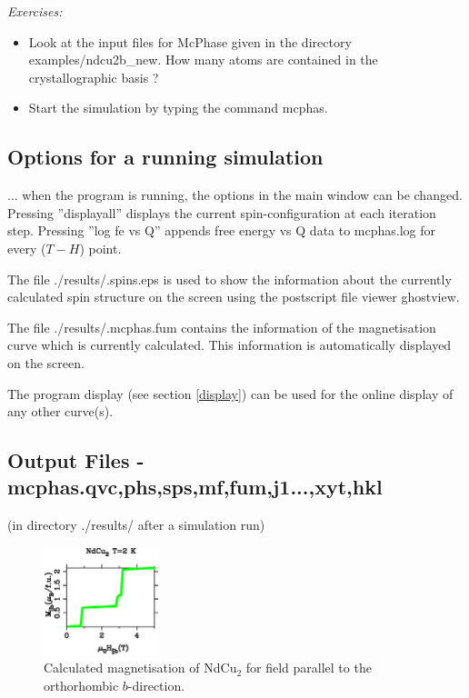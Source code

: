 \vspace{1cm}
{\em Exercises:}
\begin{itemize}
\item Look at the input files for {\prg McPhase} given in the directory
{\prg examples/ndcu2b\_new}.  How many atoms are contained in the crystallographic basis ?
\item
Start the simulation by typing the command {\prg mcphas}.
\end{itemize}



\subsection{Options for a running simulation}
... when the program is running, the options in the main window
can be changed. Pressing ''displayall'' displays the current spin-configuration
at each iteration step. Pressing ''log fe vs Q'' appends free energy vs Q
data to {\prg mcphas.log} for every ($T-H$) point.


The file {\prg ./results/.spins.eps} is used to show the information about the currently calculated
spin structure on the screen using the postscript file viewer ghostview.

The file {\prg ./results/.mcphas.fum} contains the information of the magnetisation curve
which is currently calculated. This information is automatically displayed on the screen.


The program {\prg display} (see section \ref{display}) can be used 
for the online display of any other
curve(s).


\subsection{Output Files - {\prg mcphas.qvc,phs,sps,mf,fum,j1...,xyt,hkl} }\label{outputfiles}
 (in directory ./results/ after a simulation run) 

\begin{figure}[htb]%
\begin{center}\leavevmode
\includegraphics[angle=0, width=0.3\textwidth]{figsrc/magnetization_ndcu2.ps}
\end{center}
\caption{Calculated magnetisation of NdCu$_2$ for field parallel to the orthorhombic $b$-direction.}
\label{magnetization}
\end{figure}

